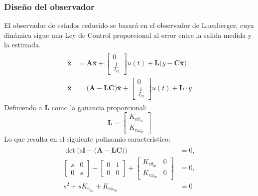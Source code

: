 \documentclass[12pt, a4paper,journal, onecolumn, compsoc]{IEEEtran}
\begin{document}
\subsubsection{Diseño del observador}
    El observador de estados reducido se basará en el observador de Luenberger, cuya dinámica sigue una Ley de Control proporcional al error entre la salida medida y la estimada.
    \begin{gather*}
    \begin{aligned}
    \dot{\bm{\bar x}}&=
    \mathrm{\bm{A}}
    \bm{\bar x} + 
    \begin{bmatrix}
    0 \\ \frac{1}{J_{eq}} 
    \end{bmatrix} u(t)+
    \mathrm{\bm{L}}\big(y -
    \mathrm{\bm{C}}\bm{\bar x}\big)\\
        \dot{\bm{\bar x}}&=
    \big(\mathrm{\bm{A}-\mathrm{\bm{L}}\mathrm{\bm{C}}\big)}\bm{\bar x} + 
    \begin{bmatrix}
    0 \\ \frac{1}{J_{eq}} 
    \end{bmatrix} u(t)+\mathrm{\bm{L}}\cdot y
    \end{aligned}
    \end{gather*}
    Definiendo a $\mathrm{\bm{L}}$ como la ganancia proporcional:
    \begin{equation*}
        \mathrm{\bm{L}}=
        \begin{bmatrix}
            K_{e\theta_m}\\
            K_{e\omega_m}
        \end{bmatrix}
    \end{equation*}
    Lo que resulta en el siguiente polinomio característico:
    \begin{gather*}
    \begin{aligned}
        \det \Big(\mathrm{s\bm{I-\big(A}}-\mathrm{\bm{LC}\big)}\Big)&=0,\\
        \begin{bmatrix}
            s & 0 \\ 
            0 & s
        \end{bmatrix}-
        \begin{bmatrix}
            0 & 1 \\
            0 & 0
        \end{bmatrix}+
        \begin{bmatrix}
            K_{e\theta_m} & 0 \\
            K_{e\omega_m} & 0
        \end{bmatrix} &=0,
        \\
        s^2 + s K_{e_{\theta_m}}+K_{e\omega_m}&=0
    \end{aligned}
    \end{gather*}
\end{document}

